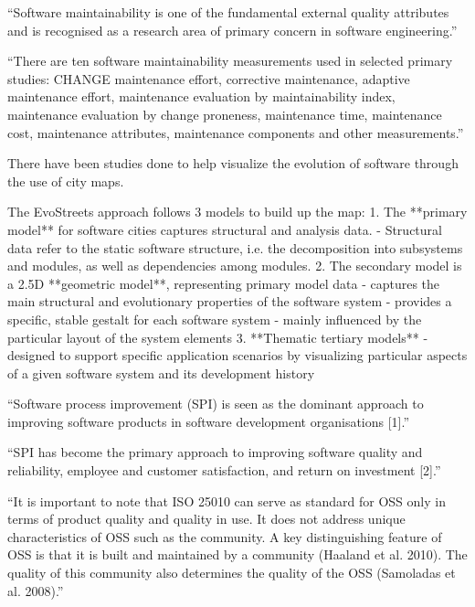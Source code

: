 \documentclass[12pt,letterpaper]{report}
\begin{document}
``Software maintainability is one of the fundamental external quality attributes and is recognised as a research area of primary concern in software engineering.'' \cite{alsolai:2019}

``There are ten software maintainability measurements used in selected primary studies: CHANGE maintenance effort, corrective maintenance, adaptive maintenance effort, maintenance evaluation by maintainability index, maintenance evaluation by change proneness, maintenance time, maintenance cost, maintenance attributes, maintenance components and other measurements.'' \cite{alsolai:2019}

There have been studies done to help visualize the evolution of software through the use of city maps. \cite{steinbruckner:2012}

The EvoStreets approach follows 3 models to build up the map:
1. The **primary model** for software cities captures structural and analysis data.
    - Structural data refer to the static software structure, i.e. the decomposition into subsystems and modules, as well as dependencies among modules.
2. The secondary model is a 2.5D **geometric model**, representing primary model data
    - captures the main structural and evolutionary properties of the software system
    - provides a specific, stable gestalt for each software system
      - mainly influenced by the particular layout of the system elements
3. **Thematic tertiary models**
    - designed to support specific application scenarios by visualizing particular aspects of a given software system and its development history
\cite{steinbruckner:2012}

``Software process improvement (SPI) is seen as the dominant approach to improving software products in software development organisations [1].'' \cite{herranz:2019}


``SPI has become the primary approach to improving software quality and reliability, employee and customer satisfaction, and return on investment [2].'' \cite{herranz:2019}


``It is important to note that ISO 25010 can serve as standard for OSS only in terms of product quality and quality in use. It does not address unique characteristics of OSS such as the community. A key distinguishing feature of OSS is that it is built and maintained by a community (Haaland et al. 2010). The quality of this community also determines the quality of the OSS (Samoladas et al. 2008).'' \cite{adewumi:2016}
\end{document}
